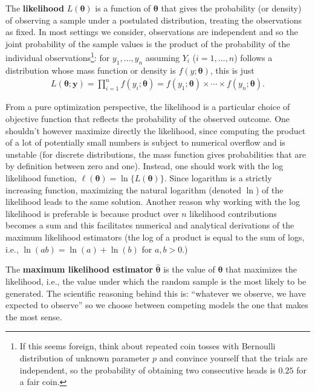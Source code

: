 \documentclass[
  11pt,
  letterpaper,
]{book}
\theoremstyle{definition}
\theoremstyle{definition}
\theoremstyle{definition}
\theoremstyle{remark}
\begin{document}
The \textbf{likelihood} \(L(\boldsymbol{\theta})\) is a function of \(\boldsymbol{\theta}\) that gives the probability (or density) of observing a sample under a postulated distribution, treating the observations as fixed. In most settings we consider, observations are independent and so the joint probability of the sample values is the product of the probability of the individual observations\footnote{If this seems foreign, think about repeated coin tosses with Bernoulli distribution of unknown parameter \(p\) and convince yourself that the trials are independent, so the probability of obtaining two consecutive heads is \(0.25\) for a fair coin.}: for \(y_1, \ldots, y_n\) assuming \(Y_i\) (\(i=1, \ldots, n\)) follows a distribution whose mass function or density is \(f(y; \boldsymbol{\theta})\), this is just
\begin{align*}
L(\boldsymbol{\theta}; \boldsymbol{y}) = \prod_{i=1}^n f(y_i; \boldsymbol{\theta}) = f(y_1; \boldsymbol{\theta}) \times \cdots \times f(y_n; \boldsymbol{\theta}).
\end{align*}

From a pure optimization perspective, the likelihood is a particular choice of objective function that reflects the probability of the observed outcome. One shouldn't however maximize directly the likelihood, since computing the product of a lot of potentially small numbers is subject to numerical overflow and is unstable (for discrete distributions, the mass function gives probabilities that are by definition between zero and one). Instead, one should work with the log likelihood function, \(\ell(\boldsymbol{\theta}) = \ln\{L(\boldsymbol{\theta})\}\). Since logarithm is a strictly increasing function, maximizing the natural logarithm (denoted \(\ln\)) of the likelihood leads to the same solution. Another reason why working with the log likelihood is preferable is because product over \(n\) likelihood contributions becomes a sum and this facilitates numerical and analytical derivations of the maximum likelihood estimators (the log of a product is equal to the sum of logs, i.e., \(\ln(ab) =\ln(a) +\ln(b)\) for \(a, b>0\).)

The \textbf{maximum likelihood estimator} \(\widehat{\boldsymbol{\theta}}\) is the value of \(\boldsymbol{\theta}\) that maximizes the likelihood, i.e., the value under which the random sample is the most likely to be generated. The scientific reasoning behind this is: ``whatever we observe, we have expected to observe'' so we choose between competing models the one that makes the most sense.
\end{document}
